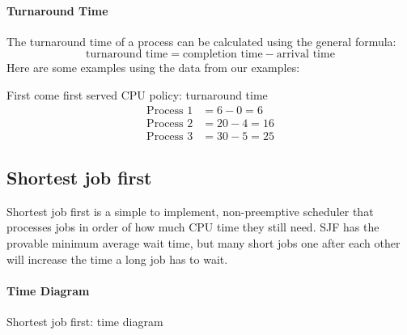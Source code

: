 \paragraph{Turnaround Time}\label{par:turnaround_time}

The turnaround time of a process can be calculated using the general formula:
\[
    \text{turnaround time} = \text{completion time} - \text{arrival time}
\]
Here are some examples using the data from our examples:
\begin{highlight}{First come first served CPU policy: turnaround time}
    \begin{align*}
        \text{Process \(1\)} & = 6 - 0 = 6   \\
        \text{Process \(2\)} & = 20 - 4 = 16 \\
        \text{Process \(3\)} & = 30 - 5 = 25
    \end{align*}
\end{highlight}

\subsection{Shortest job first}\label{sub:shortest_job_first}

Shortest job first is a simple to implement, non-preemptive scheduler that processes jobs in order of how much CPU time they still need.
SJF has the provable minimum average wait time, but many short jobs one after each other will increase the time a long job has to wait.

\paragraph{Time Diagram}\label{par:time_diagram_2}

\begin{highlight}{Shortest job first: time diagram}
\end{highlight}

